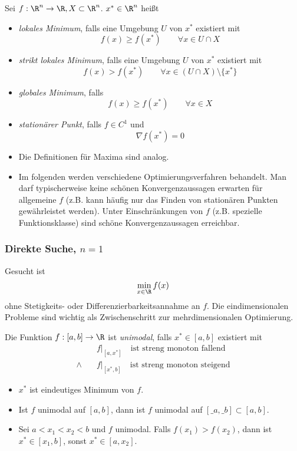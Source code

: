 \documentclass[11pt]{scrartcl}
\begin{document}
\begin{df}[Minima] \label{4.1}
	Sei $f: \R^n \to \R, X \subset \R^n$.
	$x^* \in \R^n$ heißt
	\begin{itemize}
		\item
			\emph{lokales Minimum}, falls eine Umgebung $U$ von $x^*$ existiert mit
			\[
				f(x) \ge f(x^*) \qquad \forall x\in U \cap X
			\]
		\item
			\emph{strikt lokales Minimum}, falls eine Umgebung $U$ von $x^*$ existiert mit
			\[
				f(x) > f(x^*) \qquad \forall x\in (U \cap X) \setminus \{x^*\}
			\]
		\item
			\emph{globales Minimum}, falls
			\[
				f(x) \ge f(x^*) \qquad \forall x \in X
			\]
		\item
			\emph{stationärer Punkt}, falls $f\in C^1$ und
			\[
				\nabla f(x^*) = 0
			\]
	\end{itemize}
	\begin{note}
		\begin{itemize}
			\item
				Die Definitionen für Maxima sind analog.
			\item
				Im folgenden werden verschiedene Optimierungsverfahren behandelt.
				Man darf typischerweise keine schönen Konvergenzaussagen erwarten für allgemeine $f$ (z.B. kann häufig nur das Finden von stationären Punkten gewährleistet werden).
				Unter Einschränkungen von $f$ (z.B. spezielle Funktionsklasse) sind schöne Konvergenzaussagen erreichbar.
		\end{itemize}
	\end{note}
\end{df}

\subsubsection{Direkte Suche, $n=1$}

Gesucht ist
\[
	\min_{x\in \R} f(x)
\]
ohne Stetigkeits- oder Differenzierbarkeitsannahme an $f$.
Die eindimensionalen Probleme sind wichtig als Zwischenschritt zur mehrdimensionalen Optimierung.

\begin{df} \label{4.2}
	Die Funktion $f:[a,b] \to \R$ ist \emph{unimodal}, falls $x^* \in [a,b]$ existiert mit 
	\begin{align*}
		&f\big|_{[a,x^*]} \quad \text{ist streng monoton fallend} \\
		\land \quad 
		&f\big|_{[x^*,b]} \quad \text{ist streng monoton steigend}
	\end{align*}
	\begin{note}
		\begin{itemize}
			\item
				$x^*$ ist eindeutiges Minimum von $f$.
			\item
				Ist $f$ unimodal auf $[a,b]$, dann ist $f$ unimodal auf $[\_a,\_b] \subset [a,b]$.
			\item
				Sei $a< x_1 < x_2 < b$ und $f$ unimodal.
				Falls $f(x_1) > f(x_2)$, dann ist $x^* \in [x_1,b]$, sonst $x^* \in [a,x_2]$.
		\end{itemize}
	\end{note}
\end{df}
\end{document}

